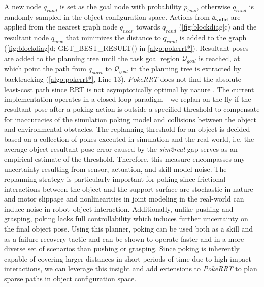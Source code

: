 A new node $q_{rand}$ is set as the goal node with probability $p_{bias}$, otherwise $q_{rand}$ is randomly sampled in the object configuration space. Actions from $\boldsymbol{a_{valid}}$ are applied from the nearest graph node $q_{near}$ towards $q_{rand}$ (\cref{fig:blockdiag}c) and the resultant node $q_{new}$ that minimizes the distance to $q_{rand}$ is added to the graph (\cref{fig:blockdiag}d; GET\_BEST\_RESULT() in \cref{algo:pokerrt*}).
Resultant poses are added to the planning tree until the task goal region $\mathcal{Q}_{goal}$ is reached, at which point the path from $q_{start}$ to $\mathcal{Q}_{goal}$ in the planning tree is extracted by backtracking (\cref{algo:pokerrt*}, Line 13). \textsl{PokeRRT} does not find the absolute least-cost path since RRT is not asymptotically optimal by nature \cite{lavalle1998rapidly}. The current implementation operates in a closed-loop paradigm---we replan on the fly if the resultant pose after a poking action is outside a specified threshold to compensate for inaccuracies of the simulation poking model and collisions between the object and environmental obstacles. The replanning threshold for an object is decided based on a collection of pokes executed in simulation and the real-world, i.e. the average object resultant pose error caused by the \textsl{sim2real} gap serves as an empirical estimate of the threshold. Therefore, this measure encompasses any uncertainty resulting from sensor, actuation, and skill model noise. The replanning strategy is particularly important for poking since frictional interactions between the object and the support surface are stochastic in nature and motor slippage and nonlinearities in joint modeling in the real-world can induce noise in robot--object interaction. Additionally, unlike pushing and grasping, poking lacks full controllability which induces further uncertainty on the final object pose.
Using this planner, poking can be used both as a skill and as a failure recovery tactic and can be shown to operate faster and in a more diverse set of scenarios than pushing or grasping.
Since poking is inherently capable of covering larger distances in short periods of time due to high impact interactions, we can leverage this insight and add extensions to \textsl{PokeRRT} to plan sparse paths in object configuration space.\vspace{-8pt}

\vspace{-10pt}

